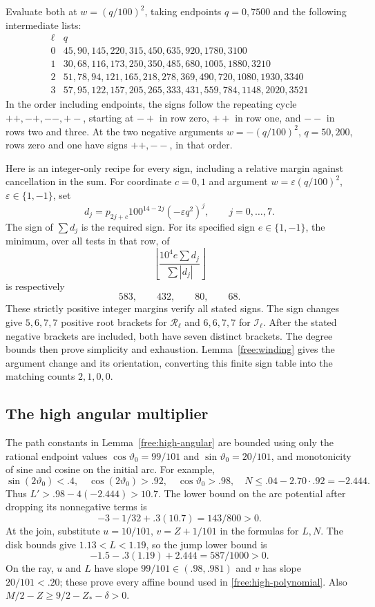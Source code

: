 \documentclass[11pt]{article}
\numberwithin{equation}{section}
\theoremstyle{definition}
\theoremstyle{remark}
\begin{document}
Evaluate both at $w=(q/100)^2$, taking endpoints $q=0,7500$
and the following intermediate lists:
\[
\begin{array}{c|l}
 \ell&q\\\hline
 0&45,90,145,220,315,450,635,920,1780,3100\\
 1&30,68,116,173,250,350,485,680,1005,1880,3210\\
 2&51,78,94,121,165,218,278,369,490,720,1080,1930,3340\\
 3&57,95,122,157,205,265,333,431,559,784,1148,2020,3521
\end{array}
\]
In the order including endpoints, the signs follow the repeating
cycle $++,-+,--,+-$, starting at $-+$ in row zero, $++$ in row one,
and $--$ in rows two and three.  At the two negative arguments
$w=-(q/100)^2$, $q=50,200$, rows zero and one have signs $++,--$,
in that order.

Here is an integer-only recipe for every sign, including a relative
margin against cancellation in the sum.  For coordinate $c=0,1$ and
argument $w=\varepsilon(q/100)^2$, $\varepsilon\in\{1,-1\}$, set
\[
 d_j=p_{2j+c}100^{14-2j}(-\varepsilon q^2)^j,
 \qquad j=0,\ldots,7.
\]
The sign of $\sum d_j$ is the required sign.  For its specified sign
$e\in\{1,-1\}$, the minimum, over all tests in that row, of
\[
 \left\lfloor\frac{10^4e\sum d_j}{\sum|d_j|}\right\rfloor
\]
is respectively
\begin{equation}\label{cert:separator-margins}
 583,\qquad432,\qquad80,\qquad68.
\end{equation}
These strictly positive integer margins verify all stated signs.
The sign changes give $5,6,7,7$ positive root brackets for
$\mathcal R_\ell$ and $6,6,7,7$ for $\mathcal I_\ell$.
After the stated negative brackets are included, both have seven
distinct brackets.  The degree bounds then prove simplicity and
exhaustion.  Lemma~\ref{free:winding} gives the argument change and
its orientation, converting this finite sign table into the matching
counts $2,1,0,0$.

\subsection{The high angular multiplier}\label{cert:high-angular}

The path constants in Lemma~\ref{free:high-angular} are bounded using
only the rational endpoint values $\cos\vartheta_0=99/101$ and
$\sin\vartheta_0=20/101$, and monotonicity of sine and cosine on the
initial arc.  For example,
\[
 \sin(2\vartheta_0)<.4,\quad \cos(2\vartheta_0)>.92,
 \quad \cos\vartheta_0>.98,
 \quad N\le.04-2.70\cdot.92=-2.444.
\]
Thus $L'>.98-4(-2.444)>10.7$.  The lower bound on the arc potential
after dropping its nonnegative terms is
\[
 -3-1/32+.3(10.7)=143/800>0.
\]
At the join, substitute
$u=10/101$, $v=Z+1/101$ in the formulas for $L,N$.
The disk bounds give $1.13<L<1.19$, so the jump lower bound is
\[
 -1.5-.3(1.19)+2.444=587/1000>0.
\]
On the ray, $u$ and $L$ have slope $99/101\in(.98,.981)$
and $v$ has slope $20/101<.20$; these prove every affine bound used
in \eqref{free:high-polynomial}.  Also $M/2-Z\ge9/2-Z_*-\delta>0$.
\end{document}
